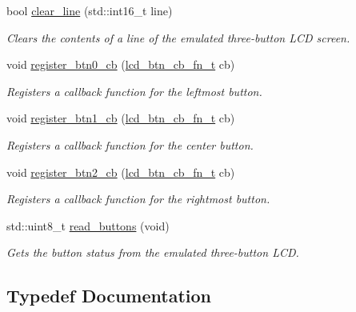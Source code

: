 \begin{DoxyCompactItemize}
bool \hyperlink{namespacepros_1_1lcd_aef44947cea9006f86d4aaa2e32856835}{clear\+\_\+line} (std\+::int16\+\_\+t line)
\begin{DoxyCompactList}\small\item\em Clears the contents of a line of the emulated three-\/button L\+CD screen. \end{DoxyCompactList}\item 
void \hyperlink{namespacepros_1_1lcd_a4d8f5121ac67ae7de816334e7b66f08d}{register\+\_\+btn0\+\_\+cb} (\hyperlink{namespacepros_1_1lcd_ab5c0cdcf37795ff2a9dcaf546b087dd4}{lcd\+\_\+btn\+\_\+cb\+\_\+fn\+\_\+t} cb)
\begin{DoxyCompactList}\small\item\em Registers a callback function for the leftmost button. \end{DoxyCompactList}\item 
void \hyperlink{namespacepros_1_1lcd_a9a3a9342268b8a95d91190ab36574a0a}{register\+\_\+btn1\+\_\+cb} (\hyperlink{namespacepros_1_1lcd_ab5c0cdcf37795ff2a9dcaf546b087dd4}{lcd\+\_\+btn\+\_\+cb\+\_\+fn\+\_\+t} cb)
\begin{DoxyCompactList}\small\item\em Registers a callback function for the center button. \end{DoxyCompactList}\item 
void \hyperlink{namespacepros_1_1lcd_a5b08f4244e366a738668a5c3f700e4be}{register\+\_\+btn2\+\_\+cb} (\hyperlink{namespacepros_1_1lcd_ab5c0cdcf37795ff2a9dcaf546b087dd4}{lcd\+\_\+btn\+\_\+cb\+\_\+fn\+\_\+t} cb)
\begin{DoxyCompactList}\small\item\em Registers a callback function for the rightmost button. \end{DoxyCompactList}\item 
std\+::uint8\+\_\+t \hyperlink{namespacepros_1_1lcd_aa6ba655373f3eb0d9ef702337e89f624}{read\+\_\+buttons} (void)
\begin{DoxyCompactList}\small\item\em Gets the button status from the emulated three-\/button L\+CD. \end{DoxyCompactList}\end{DoxyCompactItemize}


\subsection{Typedef Documentation}
\mbox{\label{namespacepros_1_1lcd_ab5c0cdcf37795ff2a9dcaf546b087dd4}} 
